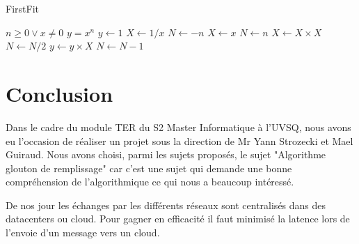 \documentclass[11pt]{article}
\begin{document}
\begin{algorithm}
    \caption{FirstFit}
    \begin{algorithmic}
    \REQUIRE $n \geq 0 \vee x \neq 0$
    \RETURN $y = x^n$
    \STATE $y \leftarrow 1$
    \STATE $X \leftarrow 1 / x$
    \STATE $N \leftarrow -n$
    \ELSE
    \STATE $X \leftarrow x$
    \STATE $N \leftarrow n$
    \ENDIF
    \STATE $X \leftarrow X \times X$
    \STATE $N \leftarrow N / 2$
    \ELSE[$N$ is odd]
    \STATE $y \leftarrow y \times X$
    \STATE $N \leftarrow N - 1$
    \ENDIF
    \ENDWHILE
    \end{algorithmic}
\end{algorithm}

\section{Conclusion}
Dans le cadre du module TER du S2 Master Informatique à l’UVSQ, nous avons eu l’occasion de réaliser un projet sous la direction de Mr Yann Strozecki et Mael Guiraud.
Nous avons choisi, parmi les sujets proposés, le sujet "Algorithme glouton de remplissage" car c'est une sujet qui demande une bonne compréhension de l'algorithmique ce qui nous a beaucoup intéressé.

De nos jour les échanges par les différents réseaux sont centralisés dans des datacenters ou cloud.
Pour gagner en efficacité il faut minimisé la latence lors de l'envoie d'un message vers un cloud.
\end{document}
